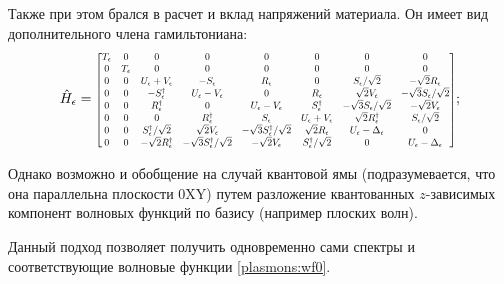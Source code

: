 \documentclass[../main.tex]{subfiles}
\newcommand{\st}{S}
\begin{document}
    Также при этом брался в расчет и вклад напряжений материала. Он имеет вид дополнительного
    члена гамильтониана:
    \begin{equation}
        \hat{H}_\epsilon =
            \rmatrix[0.7]{
                T_\epsilon       &  0 & 0 & 0 & 0 & 0 & 0 & 0\\
                0    &   T_\epsilon   & 0 & 0 & 0 & 0 & 0 & 0\\
                0    & 0  & U_\epsilon + V_\epsilon         & -\st_\epsilon                             & R_\epsilon                                & 0                              & \st_\epsilon / \sqrt{2}           & -\sqrt{2} R_\epsilon\\
                0    & 0  & -\st^\dagger_\epsilon           & U_\epsilon - V_\epsilon                   & 0                                         & R_\epsilon                     & \sqrt{2} V_\epsilon               & -\sqrt{3} \st_\epsilon /\sqrt{2}\\
                0    & 0  & R^\dagger_\epsilon              & 0                                         & U_\epsilon - V_\epsilon                   & \st^\dagger_\epsilon           & - \sqrt{3} \st_\epsilon /\sqrt{2} & - \sqrt{2} V_\epsilon\\
                0    & 0  & 0                               & R^\dagger_\epsilon                        & \st_\epsilon                              & U_\epsilon+V_\epsilon          & \sqrt{2} R_\epsilon^\dagger       & \st_\epsilon/\sqrt{2}\\
                0    & 0  & \st^\dagger_\epsilon /\sqrt{2}  & \sqrt{2} V_\epsilon                       & - \sqrt{3} \st^\dagger_\epsilon /\sqrt{2} & \sqrt{2} R_\epsilon            & U_\epsilon - \Delta_\epsilon      & 0\\
                0    & 0  & - \sqrt{2} R^\dagger_\epsilon   & -\sqrt{3} \st^\dagger_\epsilon /\sqrt{2}  & -\sqrt{2} V_\epsilon                      & \st^\dagger_\epsilon /\sqrt{2} & 0                                 & U_\epsilon - \Delta_\epsilon
            };
    \end{equation} 
    
    Однако возможно и обобщение на случай квантовой ямы (подразумевается, что она параллельна плоскости 0XY)
    путем разложение квантованных $z$-зависимых компонент волновых функций по базису (например плоских волн). 


    Данный подход позволяет получить одновременно сами спектры и соответствующие 
    волновые функции \ref{plasmons:wf0}.
\end{document}
